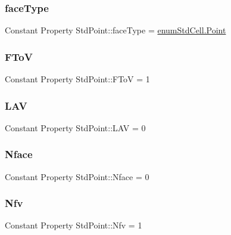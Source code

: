 \subsubsection{\texorpdfstring{face\+Type}{faceType}}
{\footnotesize\ttfamily Constant Property Std\+Point\+::face\+Type = \hyperlink{classenum_std_cell_ac4c2fa4e189e76e103f3ff9b1d19b9e7a055fa6159d5be915a3c9df01d16d5bb7}{enum\+Std\+Cell.\+Point}}

\mbox{\label{class_std_point_a96f3d942d8fe0a39738048abebed8469}} 
\subsubsection{\texorpdfstring{F\+ToV}{FToV}}
{\footnotesize\ttfamily Constant Property Std\+Point\+::\+F\+ToV = 1}

\mbox{\label{class_std_point_a925d2bd1d831ea5b938c2530c36e838a}} 
\subsubsection{\texorpdfstring{L\+AV}{LAV}}
{\footnotesize\ttfamily Constant Property Std\+Point\+::\+L\+AV = 0}

\mbox{\label{class_std_point_a2109cf8febaef4fc53790e9f4c2c33ad}} 
\subsubsection{\texorpdfstring{Nface}{Nface}}
{\footnotesize\ttfamily Constant Property Std\+Point\+::\+Nface = 0}

\mbox{\label{class_std_point_af3df768bc60c601f00018d327728595b}} 
\subsubsection{\texorpdfstring{Nfv}{Nfv}}
{\footnotesize\ttfamily Constant Property Std\+Point\+::\+Nfv = 1}

\mbox{\label{class_std_point_a0296c72e154ec959cdefd53e4bf931e1}} 
